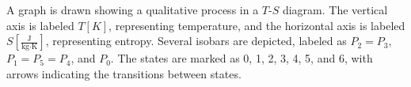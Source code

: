 A graph is drawn showing a qualitative process in a \( T \)-\( S \) diagram. The vertical axis is labeled \( T [K] \), representing temperature, and the horizontal axis is labeled \( S [\frac{\text{J}}{\text{kg·K}}] \), representing entropy. Several isobars are depicted, labeled as \( P_2 = P_3 \), \( P_1 = P_5 = P_4 \), and \( P_0 \). The states are marked as 0, 1, 2, 3, 4, 5, and 6, with arrows indicating the transitions between states.